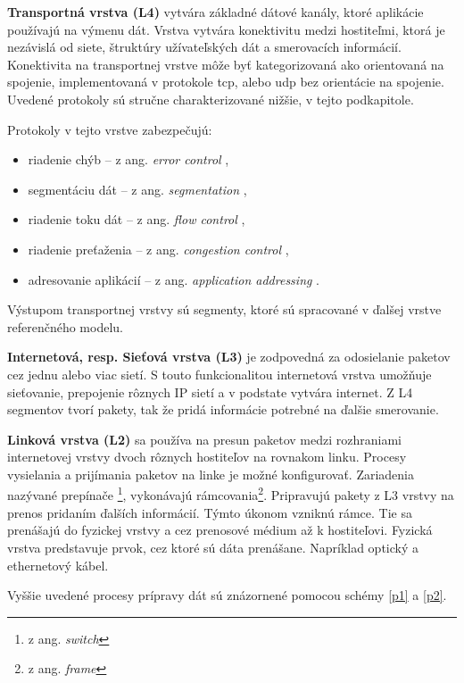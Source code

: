 \textbf{Transportná vrstva (L4)} vytvára základné dátové kanály, ktoré aplikácie používajú na výmenu dát. Vrstva vytvára konektivitu medzi hostiteľmi, ktorá je nezávislá od siete, štruktúry užívateľských dát a smerovacích informácií. Konektivita na transportnej vrstve môže byť kategorizovaná ako orientovaná na spojenie, implementovaná v protokole \acrshort{tcp}, alebo \acrshort{udp} bez orientácie na spojenie. Uvedené protokoly sú stručne charakterizované nižšie, v tejto podkapitole. 

Protokoly v tejto vrstve zabezpečujú:
\begin{itemize}
	\item{riadenie chýb} -- z ang. \textit{error control} \cite{ec},
	\item{segmentáciu dát} -- z ang. \textit{segmentation} \cite{sd},
	\item{riadenie toku dát} -- z ang. \textit{flow control} \cite{fc},
	\item{riadenie preťaženia} -- z ang. \textit{congestion control} \cite{cc},
	\item{adresovanie aplikácií} -- z ang. \textit{application addressing} \cite{aa}.
\end{itemize}
Výstupom transportnej vrstvy sú segmenty, ktoré sú spracované v ďalšej vrstve referenčného modelu. 

\textbf{Internetová, resp. Sieťová vrstva (L3)} je zodpovedná za odosielanie paketov cez jednu alebo viac sietí. S touto funkcionalitou internetová vrstva umožňuje sieťovanie, prepojenie rôznych IP sietí a v podstate vytvára internet. Z L4 segmentov tvorí pakety, tak že pridá informácie potrebné na ďalšie smerovanie. 

\textbf{Linková vrstva (L2)} sa používa na presun paketov medzi rozhraniami internetovej vrstvy dvoch rôznych hostiteľov na rovnakom linku. Procesy vysielania a prijímania paketov na linke je možné konfigurovať. Zariadenia nazývané prepínače \footnote{z ang. \textit{switch}}, vykonávajú rámcovania\footnote{z ang. \textit{frame}}. Pripravujú pakety z L3 vrstvy na prenos pridaním ďalších informácií. Týmto úkonom vzniknú rámce. Tie sa prenášajú do fyzickej vrstvy a cez prenosové médium až k hostiteľovi. Fyzická vrstva predstavuje prvok, cez ktoré sú dáta prenášane. Napríklad optický a ethernetový kábel. 

Vyššie uvedené procesy prípravy dát sú znázornené pomocou schémy \ref{p1} a \ref{p2}.

